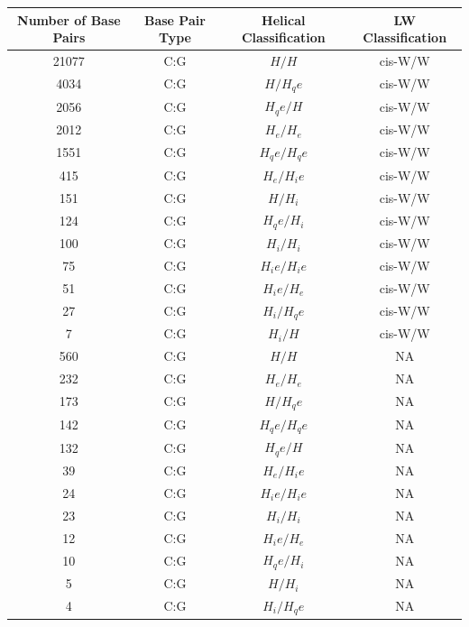        
\begin{center}
\begin{longtable}{c|c|c|c}
\hline
\bf{Number of Base Pairs} & \bf{Base Pair Type} & \bf{Helical Classification} & \bf{LW
Classification} \\ \hline \hline
  21077 & C:G & $H/H      $ & cis-W/W        \\ \hline
   4034 & C:G & $H/H_qe   $ & cis-W/W     \\ \hline
   2056 & C:G & $H_qe/H   $ & cis-W/W     \\ \hline
   2012 & C:G & $H_e/H_e  $ & cis-W/W    \\ \hline
   1551 & C:G & $H_qe/H_qe$ & cis-W/W  \\ \hline
    415 & C:G & $H_e/H_ie $ & cis-W/W   \\ \hline
    151 & C:G & $H/H_i    $ & cis-W/W      \\ \hline
    124 & C:G & $H_qe/H_i $ & cis-W/W   \\ \hline
    100 & C:G & $H_i/H_i  $ & cis-W/W    \\ \hline 
     75 & C:G & $H_ie/H_ie$ & cis-W/W  \\ \hline
     51 & C:G & $H_ie/H_e $ & cis-W/W   \\ \hline
     27 & C:G & $H_i/H_qe $ & cis-W/W   \\ \hline
      7 & C:G & $H_i/H    $ & cis-W/W      \\ \hline
    560 & C:G & $H/H      $ & NA             \\ \hline
    232 & C:G & $H_e/H_e  $ & NA         \\ \hline
    173 & C:G & $H/H_qe   $ & NA          \\ \hline
    142 & C:G & $H_qe/H_qe$ & NA       \\ \hline
    132 & C:G & $H_qe/H   $ & NA          \\ \hline
     39 & C:G & $H_e/H_ie $ & NA        \\ \hline
     24 & C:G & $H_ie/H_ie$ & NA       \\ \hline
     23 & C:G & $H_i/H_i  $ & NA         \\ \hline
     12 & C:G & $H_ie/H_e $ & NA        \\ \hline
     10 & C:G & $H_qe/H_i $ & NA        \\ \hline
      5 & C:G & $H/H_i    $ & NA           \\ \hline
      4 & C:G & $H_i/H_qe $ & NA        \\ \hline
\end{longtable}
\end{center}
       


